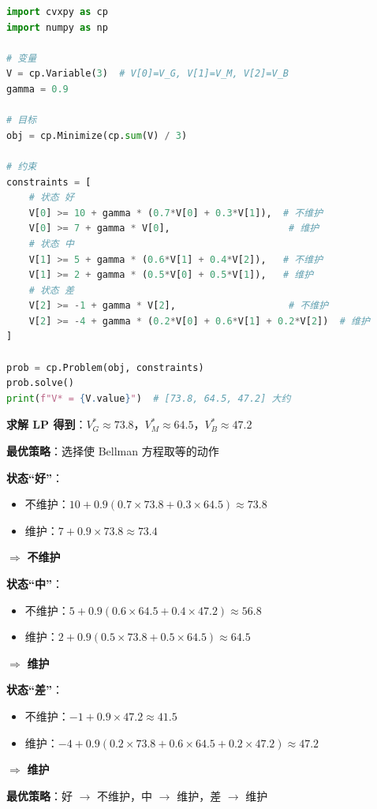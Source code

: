 \documentclass[12pt, a4paper]{ctexart}
\begin{document}
\begin{blackboard}[用 CVXPY 求解]

\begin{lstlisting}[language=Python]
import cvxpy as cp
import numpy as np

# 变量
V = cp.Variable(3)  # V[0]=V_G, V[1]=V_M, V[2]=V_B
gamma = 0.9

# 目标
obj = cp.Minimize(cp.sum(V) / 3)

# 约束
constraints = [
    # 状态 好
    V[0] >= 10 + gamma * (0.7*V[0] + 0.3*V[1]),  # 不维护
    V[0] >= 7 + gamma * V[0],                     # 维护
    # 状态 中
    V[1] >= 5 + gamma * (0.6*V[1] + 0.4*V[2]),   # 不维护
    V[1] >= 2 + gamma * (0.5*V[0] + 0.5*V[1]),   # 维护
    # 状态 差
    V[2] >= -1 + gamma * V[2],                    # 不维护
    V[2] >= -4 + gamma * (0.2*V[0] + 0.6*V[1] + 0.2*V[2])  # 维护
]

prob = cp.Problem(obj, constraints)
prob.solve()
print(f"V* = {V.value}")  # [73.8, 64.5, 47.2] 大约
\end{lstlisting}

\end{blackboard}

\begin{blackboard}[从值函数恢复最优策略]

\textbf{求解 LP 得到}：$V^*_G \approx 73.8$，$V^*_M \approx 64.5$，$V^*_B \approx 47.2$

\textbf{最优策略}：选择使 Bellman 方程取等的动作

\textbf{状态``好''}：
\begin{itemize}
    \item 不维护：$10 + 0.9(0.7 \times 73.8 + 0.3 \times 64.5) \approx 73.8$ \checkmark
    \item 维护：$7 + 0.9 \times 73.8 \approx 73.4$
\end{itemize}
$\Rightarrow$ \textbf{不维护}

\textbf{状态``中''}：
\begin{itemize}
    \item 不维护：$5 + 0.9(0.6 \times 64.5 + 0.4 \times 47.2) \approx 56.8$
    \item 维护：$2 + 0.9(0.5 \times 73.8 + 0.5 \times 64.5) \approx 64.5$ \checkmark
\end{itemize}
$\Rightarrow$ \textbf{维护}

\textbf{状态``差''}：
\begin{itemize}
    \item 不维护：$-1 + 0.9 \times 47.2 \approx 41.5$
    \item 维护：$-4 + 0.9(0.2 \times 73.8 + 0.6 \times 64.5 + 0.2 \times 47.2) \approx 47.2$ \checkmark
\end{itemize}
$\Rightarrow$ \textbf{维护}

\textbf{最优策略}：好 $\to$ 不维护，中 $\to$ 维护，差 $\to$ 维护

\end{blackboard}
\end{document}
